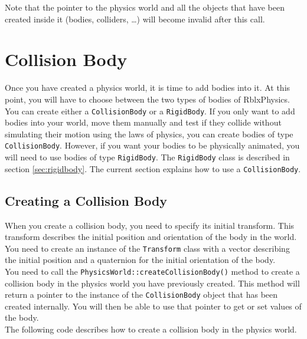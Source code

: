 \documentclass[a4paper,12pt]{article}
\begin{document}
    \vspace{0.6cm}

    Note that the pointer to the physics world and all the objects that have been created inside it (bodies, colliders, \dots) will become invalid after
    this call.

    \section{Collision Body}
    \label{sec:collisionbody}

    Once you have created a physics world, it is time to add bodies into it. At this point, you will have to choose between the two types of bodies of
    RblxPhysics. You can create either a \texttt{CollisionBody} or a \texttt{RigidBody}. If you only want to add bodies into your world, move them
    manually and test if they collide without simulating their motion using the laws of physics, you can create bodies of type \texttt{CollisionBody}.
    However, if you want your bodies to be physically animated, you will need to use bodies of type \texttt{RigidBody}. The \texttt{RigidBody} class is
    described in section \ref{sec:rigidbody}. The current section explains how to use a \texttt{CollisionBody}. 

    \subsection{Creating a Collision Body}

    When you create a collision body, you need to specify its initial transform. This transform describes the initial
    position and orientation of the body in the world. You need to create an instance of the \texttt{Transform} class with a vector describing the
    initial position and a quaternion for the initial orientation of the body. \\

    You need to call the \texttt{PhysicsWorld::createCollisionBody()} method to create a collision body in the physics world you have previously created.
    This method will return a pointer to the instance of the \texttt{CollisionBody} object that has been created internally. You will then be able to
    use that pointer to get or set values of the body. \\

    The following code describes how to create a collision body in the physics world. \\
\end{document}
